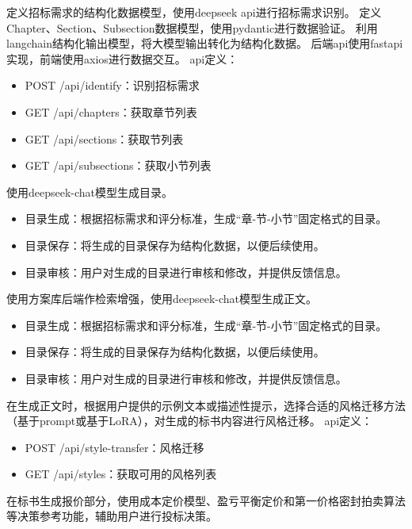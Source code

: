 \documentclass{xmu}
\begin{document}
        定义招标需求的结构化数据模型，使用deepseek api进行招标需求识别。
        定义Chapter、Section、Subsection数据模型，使用pydantic进行数据验证。
        利用langchain结构化输出模型，将大模型输出转化为结构化数据。
        后端api使用fastapi实现，前端使用axios进行数据交互。
        api定义：
        \begin{itemize}
            \item POST /api/identify：识别招标需求
            \item GET /api/chapters：获取章节列表
            \item GET /api/sections：获取节列表
            \item GET /api/subsections：获取小节列表
        \end{itemize}
        使用deepseek-chat模型生成目录。
        \begin{itemize}
            \item 目录生成：根据招标需求和评分标准，生成“章-节-小节”固定格式的目录。
            \item 目录保存：将生成的目录保存为结构化数据，以便后续使用。
            \item 目录审核：用户对生成的目录进行审核和修改，并提供反馈信息。
        \end{itemize}
        使用方案库后端作检索增强，使用deepseek-chat模型生成正文。
        \begin{itemize}
            \item 目录生成：根据招标需求和评分标准，生成“章-节-小节”固定格式的目录。
            \item 目录保存：将生成的目录保存为结构化数据，以便后续使用。
            \item 目录审核：用户对生成的目录进行审核和修改，并提供反馈信息。
        \end{itemize}
        在生成正文时，根据用户提供的示例文本或描述性提示，选择合适的风格迁移方法（基于prompt或基于LoRA），对生成的标书内容进行风格迁移。
        api定义：
        \begin{itemize}
            \item POST /api/style-transfer：风格迁移
            \item GET /api/styles：获取可用的风格列表
        \end{itemize}
        在标书生成报价部分，使用成本定价模型、盈亏平衡定价和第一价格密封拍卖算法等决策参考功能，辅助用户进行投标决策。
\end{document}
